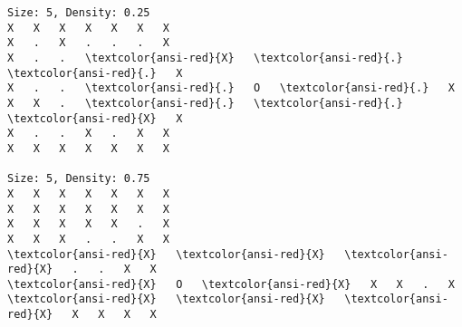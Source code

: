 \documentclass[11pt]{article}
\begin{document}
    \begin{Verbatim}[commandchars=\\\{\},fontsize=\footnotesize]
Size: 5, Density: 0.25
X   X   X   X   X   X   X
X   .   X   .   .   .   X
X   .   .   \textcolor{ansi-red}{X}   \textcolor{ansi-red}{.}   \textcolor{ansi-red}{.}   X
X   .   .   \textcolor{ansi-red}{.}   O   \textcolor{ansi-red}{.}   X
X   X   .   \textcolor{ansi-red}{.}   \textcolor{ansi-red}{.}   \textcolor{ansi-red}{X}   X
X   .   .   X   .   X   X
X   X   X   X   X   X   X

Size: 5, Density: 0.75
X   X   X   X   X   X   X
X   X   X   X   X   X   X
X   X   X   X   X   .   X
X   X   X   .   .   X   X
\textcolor{ansi-red}{X}   \textcolor{ansi-red}{X}   \textcolor{ansi-red}{X}   .   .   X   X
\textcolor{ansi-red}{X}   O   \textcolor{ansi-red}{X}   X   X   .   X
\textcolor{ansi-red}{X}   \textcolor{ansi-red}{X}   \textcolor{ansi-red}{X}   X   X   X   X
\end{Verbatim}
\newpage
\end{document}
